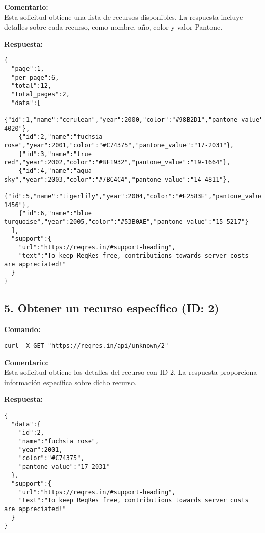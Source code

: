 \documentclass[12pt,a4paper]{article}
\begin{document}
\textbf{Comentario:}\\
Esta solicitud obtiene una lista de recursos disponibles. La respuesta incluye detalles sobre cada recurso, como nombre, año, color y valor Pantone.

\textbf{Respuesta:}
\begin{samepage}
\begin{verbatim}
{
  "page":1,
  "per_page":6,
  "total":12,
  "total_pages":2,
  "data":[
    {"id":1,"name":"cerulean","year":2000,"color":"#98B2D1","pantone_value":"15-4020"},
    {"id":2,"name":"fuchsia rose","year":2001,"color":"#C74375","pantone_value":"17-2031"},
    {"id":3,"name":"true red","year":2002,"color":"#BF1932","pantone_value":"19-1664"},
    {"id":4,"name":"aqua sky","year":2003,"color":"#7BC4C4","pantone_value":"14-4811"},
    {"id":5,"name":"tigerlily","year":2004,"color":"#E2583E","pantone_value":"17-1456"},
    {"id":6,"name":"blue turquoise","year":2005,"color":"#53B0AE","pantone_value":"15-5217"}
  ],
  "support":{
    "url":"https://reqres.in/#support-heading",
    "text":"To keep ReqRes free, contributions towards server costs are appreciated!"
  }
}
\end{verbatim}
\end{samepage}

\subsection{5. Obtener un recurso específico (ID: 2)}
\textbf{Comando:}
\begin{samepage}
\begin{verbatim}
curl -X GET "https://reqres.in/api/unknown/2"
\end{verbatim}
\end{samepage}

\textbf{Comentario:}\\
Esta solicitud obtiene los detalles del recurso con ID 2. La respuesta proporciona información específica sobre dicho recurso.

\textbf{Respuesta:}
\begin{samepage}
\begin{verbatim}
{
  "data":{
    "id":2,
    "name":"fuchsia rose",
    "year":2001,
    "color":"#C74375",
    "pantone_value":"17-2031"
  },
  "support":{
    "url":"https://reqres.in/#support-heading",
    "text":"To keep ReqRes free, contributions towards server costs are appreciated!"
  }
}
\end{verbatim}
\end{samepage}
\end{document}
